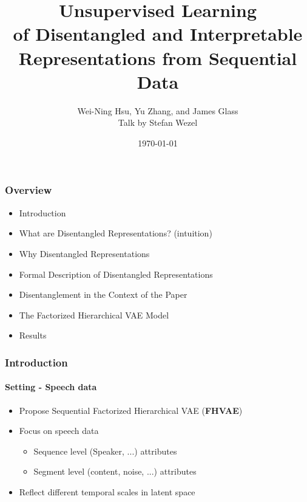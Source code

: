 \documentclass[9pt]{beamer}
\title{Unsupervised Learning \\
	of Disentangled and Interpretable Representations from Sequential Data}
\author{Wei-Ning Hsu, Yu Zhang, and James Glass\\Talk by Stefan Wezel}
\institute{Seminar ML4S}
\date{\today}
\begin{document}
	

\begin{frame}[plain]
	\titlepage
\end{frame} 



\begin{frame}
\frametitle{Overview}
\begin{itemize}%
	\item Introduction
	\item What are Disentangled Representations? (intuition)
	\item Why Disentangled Representations
	\item Formal Description of Disentangled Representations
	\item Disentanglement in the Context of the Paper
	\item The Factorized Hierarchical VAE Model
	\item Results
\end{itemize}
\end{frame} 



\begin{frame}
\frametitle{Introduction}
\framesubtitle{Setting - Speech data}
\begin{itemize}%
	\item Propose Sequential Factorized Hierarchical VAE (\textbf{FHVAE})
	\item Focus on speech data
	\begin{itemize}
		\item Sequence level (Speaker, ...) attributes
		\item Segment level (content, noise, ...) attributes
	\end{itemize}
	\item Reflect different temporal scales in latent space
\end{itemize}
\end{frame} 
\end{document}
